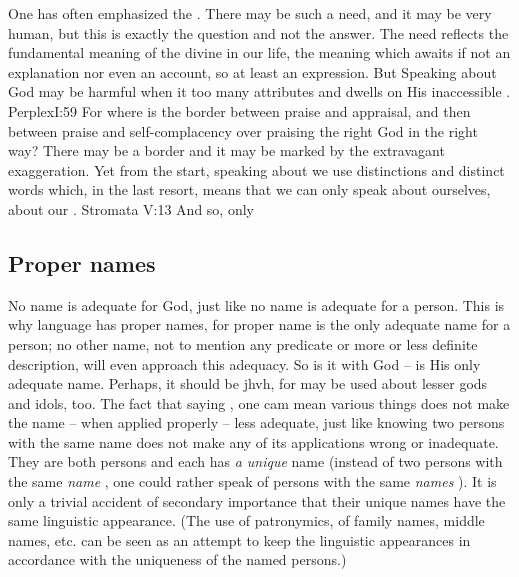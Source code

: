 One has often emphasized the . There may be
such a need, and it may be very human, but this is exactly the question and not
the answer.  The need reflects the fundamental meaning of the divine in our
life, the meaning which awaits if not an explanation nor even an account, so at
least an expression. But  Speaking about God may
be harmful when it  too many attributes and dwells on His
inaccessible .  \citet{We cannot approve of what those foolish
persons do who are extravagant in praise, fluent and prolix in the prayers they
compose, and in the hymns they make in the desire to approach the
Creator.}{Perplex}{I:59} For where is the border between praise and appraisal,
and then between praise and self-complacency over praising the right God in the
right way? There may be a border and it may be marked by the extravagant
exaggeration. Yet from the start, speaking about  we use
distinctions and distinct words which, in the last resort, means that we can
only speak about ourselves, about our . \citet{Everything
which falls under a name is originated, whether [we] will or not.}{Stromata}{
V:13} And so, only 

\subsection{Proper names}
\pa No name is adequate for God, just like no name is adequate for a
person. This is why language has proper names, for proper name is the only
adequate name for a person; no other name, not to mention any predicate or more
or less definite description, will even approach this adequacy. So is it with
God --  is His only adequate name. Perhaps, it should be {\sc jhvh}, for
 may be used about lesser gods and idols, too. The fact that saying
, one cam mean various things does not make the name -- when applied
properly -- less adequate, just like knowing two persons with the same name
 does not make any of its applications wrong or inadequate.  They are
both persons and each has {\em a unique} name (instead of two persons with the
same {\em name} , one could rather speak of persons with the same
{\em names} ). It is only a trivial accident of secondary importance
that their unique names have the same linguistic appearance. (The use
of patronymics, of family names, middle names, etc. can be seen as an attempt to
keep the linguistic appearances in accordance with the uniqueness of the named
persons.)


